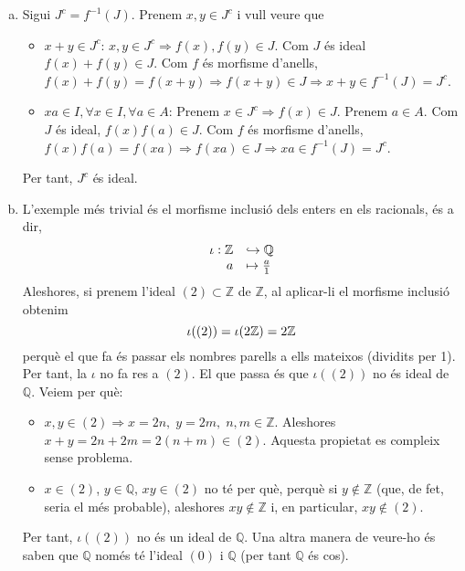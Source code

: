 \documentclass[../main.tex]{subfiles}
\begin{document}
\begin{sol}
\begin{enumerate}[(a)]
    \item Sigui $J^c = f^{-1}(J)$. Prenem $x,y\in J^c $ i vull veure que
    \begin{itemize}
        \item \underline{$x+y\in J^c$}: $x,y\in J^c\Rightarrow f(x),f(y)\in J$. Com $J$ és ideal $f(x)+f(y)\in J$. Com $f$ és morfisme d'anells, $f(x)+f(y) = f(x+y) \Rightarrow f(x+y)\in J \Rightarrow x+y\in f^{-1}(J) =J^c$.
        \item \underline{$xa\in I,\forall x\in I,\forall a\in A$}: Prenem $x\in J^c\Rightarrow f(x)\in J$. Prenem $a\in A$. Com $J$ és ideal, $f(x)f(a)\in J$. Com $f$ és morfisme d'anells, $f(x)f(a) = f(xa)\Rightarrow f(xa)\in J\Rightarrow xa\in f^{-1}(J) = J^c$.
    \end{itemize}
    Per tant, $J^c$ és ideal.
    
    \item L'exemple més trivial és el morfisme inclusió dels enters en els racionals, és a dir,
    \begin{equation}
        \notag
        \begin{array}{rl}
            \iota:\mathbb{Z} & \hookrightarrow\mathbb{Q} \\
            a & \mapsto \frac{a}{1}
        \end{array}
    \end{equation}
    Aleshores, si prenem l'ideal $(2)\subset \mathbb{Z}$ de $\mathbb{Z}$, al aplicar-li el morfisme inclusió obtenim
    \begin{equation}
        \notag
        \iota((2)) = \iota(2\mathbb{Z}) = 2\mathbb{Z}
    \end{equation}
    perquè el que fa és passar els nombres parells a ells mateixos (dividits per 1). Per tant, la $\iota$ no fa res a $(2)$. El que passa és que $\iota((2))$ no és ideal de $\mathbb{Q}$. Veiem per què:
    \begin{itemize}
        \item $x,y\in (2)\Rightarrow x=2n,\;y=2m,\;n,m\in\mathbb{Z}$. Aleshores $x+y = 2n+2m = 2(n+m)\in (2)$. Aquesta propietat es compleix sense problema.
        \item $x\in (2)$, $y\in \mathbb{Q}$, $xy\in (2)$ no té per què, perquè si $y\not\in\mathbb{Z}$ (que, de fet, seria el més probable), aleshores $xy\not\in \mathbb{Z}$ i, en particular, $xy\not\in (2)$.
    \end{itemize}
    Per tant, $\iota((2))$ no és un ideal de $\mathbb{Q}$. Una altra manera de veure-ho és saben que $\mathbb{Q}$ només té l'ideal $(0)$ i $\mathbb{Q}$ (per tant $\mathbb{Q}$ és cos).
    

\end{enumerate}
\end{sol}
\end{document}
